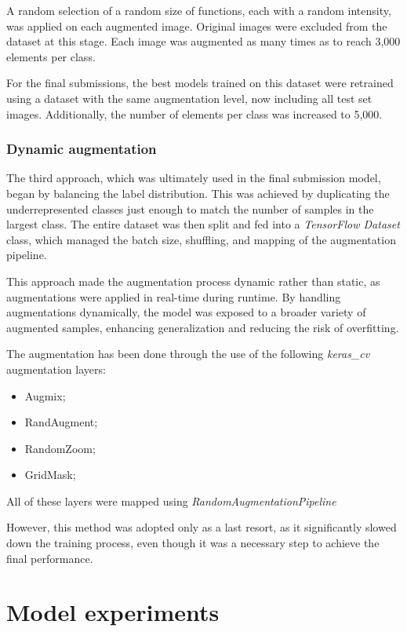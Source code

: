 \documentclass[11pt]{article}
\begin{document}
A random selection of a random size of functions, each with a random intensity, was applied on each augmented image.
Original images were excluded from the dataset at this stage. 
Each image was augmented as many times as to reach 3,000 elements per class.

For the final submissions, the best models trained on this dataset were retrained using a dataset with the same augmentation level, now including all test set images. 
Additionally, the number of elements per class was increased to 5,000.

\subsubsection{Dynamic augmentation}

The third approach, which was ultimately used in the final submission model, began by balancing the label distribution.
This was achieved by duplicating the underrepresented classes just enough to match the number of samples in the largest class.
The entire dataset was then split and fed into a \textit{TensorFlow Dataset} class, which managed the batch size, shuffling, and mapping of the augmentation pipeline.

This approach made the augmentation process dynamic rather than static, as augmentations were applied in real-time during runtime. 
By handling augmentations dynamically, the model was exposed to a broader variety of augmented samples, enhancing generalization and reducing the risk of overfitting.

The augmentation has been done through the use of the following \textit{keras\_cv} augmentation layers:
\begin{itemize}
    \item Augmix;
    \item RandAugment;
    \item RandomZoom;
    \item GridMask;
\end{itemize}
All of these layers were mapped using \textit{RandomAugmentationPipeline}

However, this method was adopted only as a last resort, as it significantly slowed down the training process, even though it was a necessary step to achieve the final performance.

\section{Model experiments}
\end{document}
